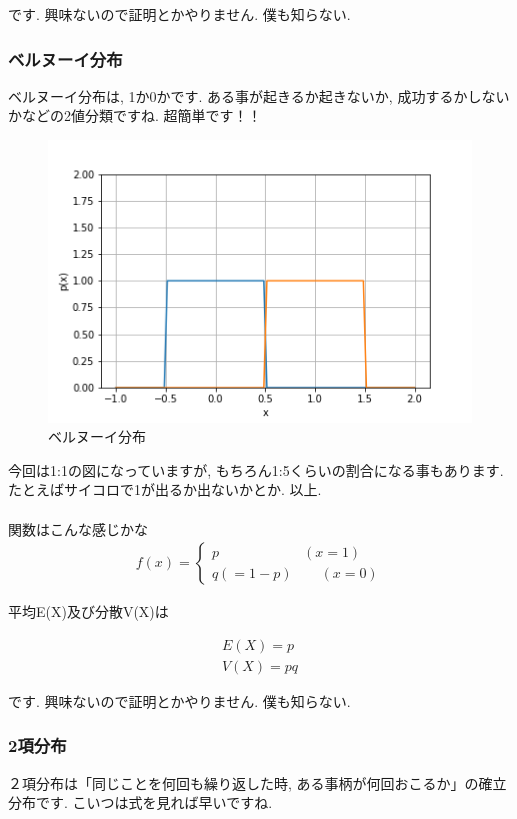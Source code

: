 \documentclass[11pt,a4paper]{jsarticle}                    %
\begin{document}
です. 興味ないので証明とかやりません. 僕も知らない.
\subsubsection{ベルヌーイ分布}
ベルヌーイ分布は, 1か0かです. ある事が起きるか起きないか, 成功するかしないかなどの2値分類ですね. 超簡単です！！\\

\begin{figure}[H]
\label{im:bernoulli}
  \centering
  \includegraphics[width=120mm,bb=0 0 432 288]{figures/bernoulli.png}
  \caption{ベルヌーイ分布}
\end{figure}
今回は1:1の図になっていますが, もちろん1:5くらいの割合になる事もあります. たとえばサイコロで1が出るか出ないかとか. 以上.\\
\\
関数はこんな感じかな
\begin{eqnarray}
f(x)=
  \left\{
    \begin{array}{l}
      p \qquad \qquad \qquad (x = 1) \\
      q(=1-p)  \qquad (x=0)
    \end{array}
  \right.
\end{eqnarray}

平均E(X)及び分散V(X)は

\begin{eqnarray}
E(X) = p\\
V(X) = pq
\end{eqnarray}

です. 興味ないので証明とかやりません. 僕も知らない.
\subsubsection{2項分布}
２項分布は「同じことを何回も繰り返した時, ある事柄が何回おこるか」の確立分布です. こいつは式を見れば早いですね.
\end{document}
